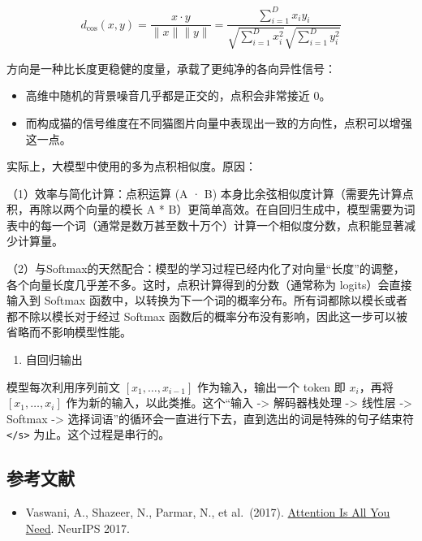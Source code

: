 \[
d_{\cos}(x,y)=\frac{x\cdot y}{\|x\|\|y\|}=\frac{\sum_{i=1}^{D}x_i y_i}{\sqrt{\sum_{i=1}^{D}x_i^2}\sqrt{\sum_{i=1}^{D}y_i^2}}
\]

方向是一种比长度更稳健的度量，承载了更纯净的各向异性信号：

\begin{itemize}
\tightlist
\item
  高维中随机的背景噪音几乎都是正交的，点积会非常接近 0。
\item
  而构成猫的信号维度在不同猫图片向量中表现出一致的方向性，点积可以增强这一点。
\end{itemize}

实际上，大模型中使用的多为点积相似度。原因：

（1）效率与简化计算\hspace{0pt}：点积运算 (A · B) 本身比余弦相似度计算（需要先计算点积，再除以两个向量的模长 \textbar\textbar A\textbar\textbar{} * \textbar\textbar B\textbar\textbar）更简单高效。在自回归生成中，模型需要为词表中的每一个词（通常是数万甚至数十万个）计算一个相似度分数，点积能显著减少计算量。

（2）与Softmax的天然配合：模型的学习过程已经内化了对向量``长度''的调整，各个向量长度几乎差不多。这时，点积计算得到的分数（通常称为 logits）会直接输入到 Softmax 函数中，以转换为下一个词的概率分布。所有词都除以模长或者都不除以模长对于经过 Softmax 函数后的概率分布没有影响，因此这一步可以被省略而不影响模型性能。

\begin{enumerate}
\def\labelenumi{\arabic{enumi}.}
\setcounter{enumi}{2}
\tightlist
\item
  自回归输出
\end{enumerate}

模型每次利用序列前文 \([x_1,\ldots,x_{i-1}]\) 作为输入，输出一个 token 即 \(x_i\)，再将 \([x_1,\ldots,x_i]\) 作为新的输入，以此类推。这个``输入 -\textgreater{} 解码器栈处理 -\textgreater{} 线性层 -\textgreater{} Softmax -\textgreater{} 选择词语''的循环会一直进行下去，直到选出的词是特殊的句子结束符 \texttt{\textless{}/s\textgreater{}} 为止。这个过程是串行的。

\hypertarget{ux53c2ux8003ux6587ux732e-69}{%
\subsection{参考文献}\label{ux53c2ux8003ux6587ux732e-69}}

\vspace{0.25em}
\begin{itemize}
\tightlist
\item
  Vaswani, A., Shazeer, N., Parmar, N., et al.~(2017). \href{https://arxiv.org/abs/1706.03762}{Attention Is All You Need}. NeurIPS 2017.
\end{itemize}

